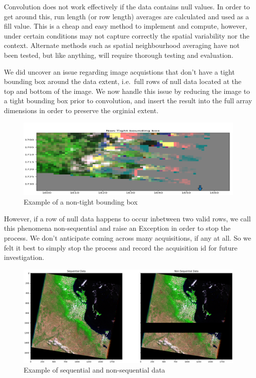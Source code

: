 \documentclass[a4paper]{article}
\begin{document}
    \begin{flushleft}
      Convolution does not work effectively if the data contains null values. In order to get around this, run length (or row length) averages are calculated and used as a fill value. This is a cheap and easy method to implement and compute, however, under certain conditions may not capture correctly the spatial variability nor the context. Alternate methods such as spatial neighbourhood averaging have not been tested, but like anything, will require thorough testing and evaluation. \par
      We did uncover an issue regarding image acquistions that don't have a tight bounding box around the data extent, i.e.\ full rows of null data located at the top and bottom of the image. We now handle this issue by reducing the image to a tight bounding box prior to convolution, and insert the result into the full array dimensions in order to preserve the orginial extent. \par

    \begin{figure}[h!]
      \centering
      \caption{Example of a non-tight bounding box}\label{fig:1}
      \includegraphics[scale=0.30]{non-tight-bounding-box.png}
    \end{figure}

      However, if a row of null data happens to occur inbetween two valid rows, we call this phenomena non-sequential and raise an Exception in order to stop the process. We don't anticipate coming across many acquisitions, if any at all. So we felt it best to simply stop the process and record the acquisition id for future investigation. \par

    \begin{figure}[h!]
      \hspace*{-1.0cm}
      \centering
      \caption{Example of sequential and non-sequential data}\label{fig:2}
      \includegraphics[scale=0.30]{sequential-non-sequential-crop.png}
    \end{figure}


\end{flushleft}
\end{document}
